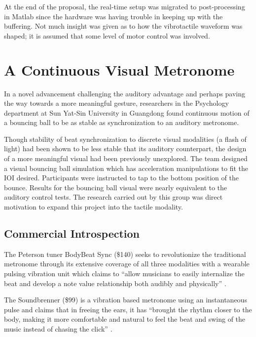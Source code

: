 At the end of the proposal, the real-time setup was migrated to post-processing in Matlab since the hardware was having trouble in keeping up with the buffering. Not much insight was given as to how the vibrotactile waveform was shaped; it is assumed that some level of motor control was involved.

\section{A Continuous Visual Metronome} \label{visualMet}
In a novel advancement challenging the auditory advantage and perhaps paving the way towards a more meaningful gesture, researchers in the Psychology department at Sun Yat-Sin University in Guangdong found continuous motion of a bouncing ball to be as stable as synchronization to an auditory metronome.
~\cite{gan2015synchronization}

Though stability of beat synchronization to discrete visual modalities (a flash of light) had been shown to be less stable that its auditory counterpart, the design of a more meaningful visual had been previously unexplored. The team designed a visual bouncing ball simulation which has acceleration manipulations to fit the IOI desired. Participants were instructed to tap to the bottom position of the bounce. Results for the bouncing ball visual were nearly equivalent to the auditory control tests. The research carried out by this group was direct motivation to expand this project into the tactile modality.

\subsection{Commercial Introspection} \label{commercial}
The Peterson tuner BodyBeat Sync (\$140) seeks to revolutionize the traditional metronome through its extensive coverage of all three modalities with a wearable pulsing vibration unit which claims to “allow musicians to easily internalize the beat and develop a note value relationship both audibly and physically” \cite{Peterson}.

The Soundbrenner (\$99) is a vibration based metronome using an instantaneous pulse and claims that in freeing the ears, it has “brought the rhythm closer to the body, making it more comfortable and natural to feel the beat and swing of the music instead of chasing the click” \cite{Soundbrenner}.
